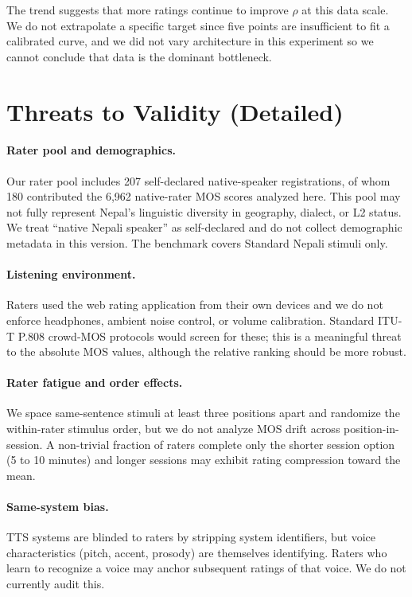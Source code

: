 \documentclass[11pt]{article}
\begin{document}
The trend suggests that more ratings continue to improve $\rho$ at this data scale. We do not extrapolate a specific target since five points are insufficient to fit a calibrated curve, and we did not vary architecture in this experiment so we cannot conclude that data is the dominant bottleneck.

\section{Threats to Validity (Detailed)}
\label{appx:limitations}

\paragraph{Rater pool and demographics.} Our rater pool includes 207 self-declared native-speaker registrations, of whom 180 contributed the 6{,}962 native-rater MOS scores analyzed here. This pool may not fully represent Nepal's linguistic diversity in geography, dialect, or L2 status. We treat ``native Nepali speaker'' as self-declared and do not collect demographic metadata in this version. The benchmark covers Standard Nepali stimuli only.

\paragraph{Listening environment.} Raters used the web rating application from their own devices and we do not enforce headphones, ambient noise control, or volume calibration. Standard ITU-T P.808 crowd-MOS protocols would screen for these; this is a meaningful threat to the absolute MOS values, although the relative ranking should be more robust.

\paragraph{Rater fatigue and order effects.} We space same-sentence stimuli at least three positions apart and randomize the within-rater stimulus order, but we do not analyze MOS drift across position-in-session. A non-trivial fraction of raters complete only the shorter session option (5 to 10 minutes) and longer sessions may exhibit rating compression toward the mean.

\paragraph{Same-system bias.} TTS systems are blinded to raters by stripping system identifiers, but voice characteristics (pitch, accent, prosody) are themselves identifying. Raters who learn to recognize a voice may anchor subsequent ratings of that voice. We do not currently audit this.
\end{document}
